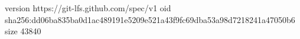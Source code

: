 version https://git-lfs.github.com/spec/v1
oid sha256:dd06ba835ba0d1ac489191e5209e521a43f9fc69dba53a98d7218241a47050b6
size 43840
